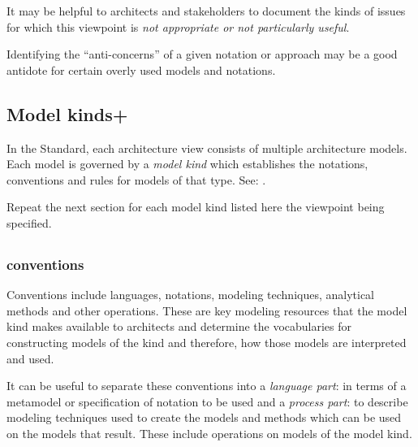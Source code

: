 It may be helpful to architects and stakeholders to
document the kinds of issues for which this viewpoint is \emph{not
  appropriate or not particularly useful}.

Identifying the ``anti-concerns'' of a given notation or approach may
be a good antidote for certain overly used models and notations.




\subsection{Model kinds+}\label{mk:list}


In the Standard, each architecture view consists of multiple
architecture models. Each model is governed by a \textit{model kind}
which establishes the notations, conventions and rules for models of
that type.  See: .

Repeat the next section for each model kind listed here the viewpoint
being specified.


\subsection{}\label{vp:mk}



\subsubsection{ conventions} 


Conventions include languages, notations, modeling techniques,
analytical methods and other operations. These are key modeling
resources that the model kind makes available to architects and
determine the vocabularies for constructing models of the kind and
therefore, how those models are interpreted and used.

It can be useful to separate these conventions into a \emph{language
  part}: in terms of a metamodel or specification of notation to be
used and a \emph{process part}: to describe modeling techniques used
to create the models and methods which can be used on the models that
result.  These include operations on models of the model kind.

